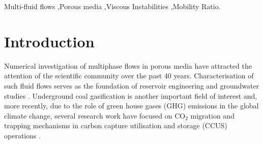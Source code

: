 \documentclass[preprint,authoryear,12pt]{elsarticle}
\begin{document}
\begin{frontmatter}
\begin{abstract}

  
\end{abstract}



\begin{keyword} %
 Multi-fluid flows \sep Porous media \sep Viscous Instabilities \sep Mobility Ratio.
\end{keyword}
 
\end{frontmatter}



\section{Introduction}\label{section:intro}
Numerical investigation of multiphase flows in porous media have attracted the attention of the scientific community over the past 40 years. Characterisation of such fluid flows serves as the foundation of reservoir engineering and groundwater studies \citep{white_1981}. %
Underground coal gasification is another important field of interest and, more recently, due to the role of green house gases (GHG) emissions in the global climate change, several research work have focused on CO$_{2}$ migration and trapping mechanisms in carbon capture utilisation and storage (CCUS) operations \citep{spycher_2003, self_2012, jiang_2011}.
\end{document}
